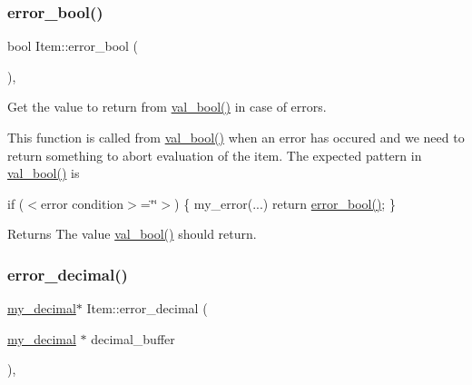 \mbox{\label{classItem_a45c8c303465b71321c15ae43583de83f}} 
\subsubsection{\texorpdfstring{error\+\_\+bool()}{error\_bool()}}
{\footnotesize\ttfamily bool Item\+::error\+\_\+bool (\begin{DoxyParamCaption}{ }\end{DoxyParamCaption})\hspace{0.3cm}{\ttfamily [inline]}, {\ttfamily [protected]}}

Get the value to return from \mbox{\hyperlink{classItem_a875594d2b9d99ccff3863bfd435828f0}{val\+\_\+bool()}} in case of errors.

This function is called from \mbox{\hyperlink{classItem_a875594d2b9d99ccff3863bfd435828f0}{val\+\_\+bool()}} when an error has occured and we need to return something to abort evaluation of the item. The expected pattern in \mbox{\hyperlink{classItem_a875594d2b9d99ccff3863bfd435828f0}{val\+\_\+bool()}} is

if ($<$error condition$>$=\char`\"{}\char`\"{}$>$) \{ my\+\_\+error(...) return \mbox{\hyperlink{classItem_a45c8c303465b71321c15ae43583de83f}{error\+\_\+bool()}}; \}

\begin{DoxyReturn}{Returns}
The value \mbox{\hyperlink{classItem_a875594d2b9d99ccff3863bfd435828f0}{val\+\_\+bool()}} should return. 
\end{DoxyReturn}
\mbox{\label{classItem_a78123cd543a38626c2bff77164653ccf}} 
\subsubsection{\texorpdfstring{error\+\_\+decimal()}{error\_decimal()}}
{\footnotesize\ttfamily \mbox{\hyperlink{classmy__decimal}{my\+\_\+decimal}}$\ast$ Item\+::error\+\_\+decimal (\begin{DoxyParamCaption}\item[{\mbox{\hyperlink{classmy__decimal}{my\+\_\+decimal}} $\ast$}]{decimal\+\_\+buffer }\end{DoxyParamCaption})\hspace{0.3cm}{\ttfamily [inline]}, {\ttfamily [protected]}}

